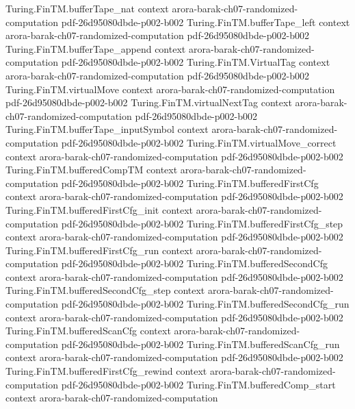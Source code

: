 \begin{theorem}
\proofstep
  {Turing.FinTM.bufferTape_nat}
  {context}
  {arora-barak-ch07-randomized-computation}
  {pdf-26d95080dbde-p002-b002}
\proofstep
  {Turing.FinTM.bufferTape_left}
  {context}
  {arora-barak-ch07-randomized-computation}
  {pdf-26d95080dbde-p002-b002}
\proofstep
  {Turing.FinTM.bufferTape_append}
  {context}
  {arora-barak-ch07-randomized-computation}
  {pdf-26d95080dbde-p002-b002}
\proofstep
  {Turing.FinTM.VirtualTag}
  {context}
  {arora-barak-ch07-randomized-computation}
  {pdf-26d95080dbde-p002-b002}
\proofstep
  {Turing.FinTM.virtualMove}
  {context}
  {arora-barak-ch07-randomized-computation}
  {pdf-26d95080dbde-p002-b002}
\proofstep
  {Turing.FinTM.virtualNextTag}
  {context}
  {arora-barak-ch07-randomized-computation}
  {pdf-26d95080dbde-p002-b002}
\proofstep
  {Turing.FinTM.bufferTape_inputSymbol}
  {context}
  {arora-barak-ch07-randomized-computation}
  {pdf-26d95080dbde-p002-b002}
\proofstep
  {Turing.FinTM.virtualMove_correct}
  {context}
  {arora-barak-ch07-randomized-computation}
  {pdf-26d95080dbde-p002-b002}
\proofstep
  {Turing.FinTM.bufferedCompTM}
  {context}
  {arora-barak-ch07-randomized-computation}
  {pdf-26d95080dbde-p002-b002}
\proofstep
  {Turing.FinTM.bufferedFirstCfg}
  {context}
  {arora-barak-ch07-randomized-computation}
  {pdf-26d95080dbde-p002-b002}
\proofstep
  {Turing.FinTM.bufferedFirstCfg_init}
  {context}
  {arora-barak-ch07-randomized-computation}
  {pdf-26d95080dbde-p002-b002}
\proofstep
  {Turing.FinTM.bufferedFirstCfg_step}
  {context}
  {arora-barak-ch07-randomized-computation}
  {pdf-26d95080dbde-p002-b002}
\proofstep
  {Turing.FinTM.bufferedFirstCfg_run}
  {context}
  {arora-barak-ch07-randomized-computation}
  {pdf-26d95080dbde-p002-b002}
\proofstep
  {Turing.FinTM.bufferedSecondCfg}
  {context}
  {arora-barak-ch07-randomized-computation}
  {pdf-26d95080dbde-p002-b002}
\proofstep
  {Turing.FinTM.bufferedSecondCfg_step}
  {context}
  {arora-barak-ch07-randomized-computation}
  {pdf-26d95080dbde-p002-b002}
\proofstep
  {Turing.FinTM.bufferedSecondCfg_run}
  {context}
  {arora-barak-ch07-randomized-computation}
  {pdf-26d95080dbde-p002-b002}
\proofstep
  {Turing.FinTM.bufferedScanCfg}
  {context}
  {arora-barak-ch07-randomized-computation}
  {pdf-26d95080dbde-p002-b002}
\proofstep
  {Turing.FinTM.bufferedScanCfg_run}
  {context}
  {arora-barak-ch07-randomized-computation}
  {pdf-26d95080dbde-p002-b002}
\proofstep
  {Turing.FinTM.bufferedFirstCfg_rewind}
  {context}
  {arora-barak-ch07-randomized-computation}
  {pdf-26d95080dbde-p002-b002}
\proofstep
  {Turing.FinTM.bufferedComp_start}
  {context}
  {arora-barak-ch07-randomized-computation}

\end{theorem}
